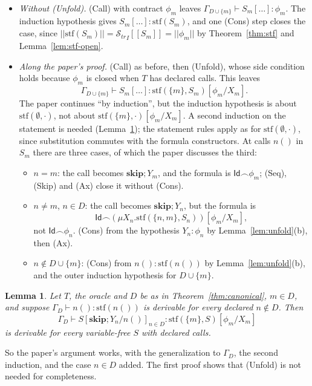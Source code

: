 \documentclass[11pt]{article}
\newcommand{\sem}[1]{[\![ #1 ]\!]}
\newcommand{\fsem}[1]{|\!|#1|\!|}
\newcommand{\Str}{{\mathcal{S}_{\mathit{tr}}}}
\newcommand{\chop}{\smallfrown}
\newcommand{\Id}{\mathsf{Id}}
\newcommand{\stf}{\mathrm{stf}}
\newcommand{\kw}[1]{\mathbf{#1}}
\newcommand{\skipS}{\kw{skip}}
\newcommand{\call}[1]{#1()}
\theoremstyle{plain}
\newtheorem{lemma}[theorem]{Lemma}
\theoremstyle{definition}
\theoremstyle{remark}
\begin{document}
\begin{itemize}
\item \emph{Without (Unfold).} (Call) with contract $\phi_m$ leaves
  $\Gamma_{D \cup \{m\}} \vdash S_m[\ldots] : \phi_m$. The induction
  hypothesis gives $S_m[\ldots] : \stf(S_m)$, and one (Cons) step closes the
  case, since $\fsem{\stf(S_m)} = \Str_I\sem{S_m} = \fsem{\phi_m}$ by
  Theorem~\ref{thm:stf} and Lemma~\ref{lem:stf-open}.
\item \emph{Along the paper's proof.} (Call) as before, then (Unfold),
  whose side condition holds because $\phi_m$ is closed when $T$ has
  declared calls. This leaves
  \[
    \Gamma_{D \cup \{m\}} \vdash S_m[\ldots] : \stf(\{m\}, S_m)[\phi_m/X_m].
  \]
  The paper continues ``by induction'', but
  the induction hypothesis is about $\stf(\emptyset, \cdot)$, not about
  $\stf(\{m\}, \cdot)[\phi_m/X_m]$. A second induction on the statement is
  needed (Lemma~\ref{lem:walk}); the statement rules apply as for
  $\stf(\emptyset, \cdot)$, since substitution commutes with the formula
  constructors. At calls $\call{n}$ in $S_m$ there are three cases, of which
  the paper discusses the third:
  \begin{itemize}
  \item $n = m$: the call becomes $\skipS;Y_m$, and the formula is
    $\Id\chop\phi_m$; (Seq), (Skip) and (Ax) close it without (Cons).
  \item $n \neq m$, $n \in D$: the call becomes $\skipS;Y_n$, but the
    formula is
    \[
      \Id\chop(\mu X_n.\stf(\{n, m\}, S_n))[\phi_m/X_m],
    \]
    not $\Id\chop\phi_n$. (Cons) from the hypothesis $Y_n : \phi_n$ by
    Lemma~\ref{lem:unfold}(b), then (Ax).
  \item $n \notin D \cup \{m\}$: (Cons) from $\call{n} : \stf(\call{n})$ by
    Lemma~\ref{lem:unfold}(b), and the outer induction hypothesis for
    $D \cup \{m\}$.
  \end{itemize}
\end{itemize}

\begin{lemma}\label{lem:walk}
  Let $T$, the oracle and $D$ be as in Theorem~\ref{thm:canonical}, $m \in
  D$, and suppose $\Gamma_D \vdash \call{n} : \stf(\call{n})$ is derivable
  for every declared $n \notin D$. Then
  \[
    \Gamma_D \vdash S[\skipS;Y_{n}/n()]_{n \in D} : \stf(\{m\}, S)[\phi_m/X_m]
  \]
  is derivable for every variable-free $S$ with declared calls.
\end{lemma}

So the paper's argument works, with the generalization to $\Gamma_D$, the
second induction, and the case $n \in D$ added. The first proof shows that
(Unfold) is not needed for completeness.
\end{document}
